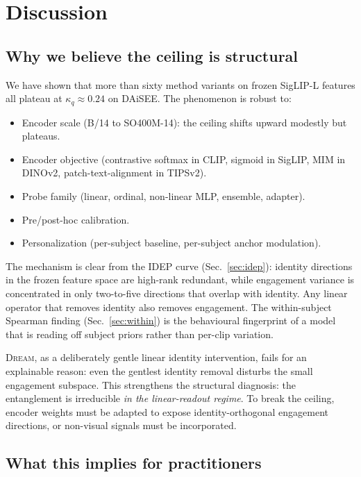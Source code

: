 \section{Discussion}
\label{sec:discussion}

\subsection{Why we believe the ceiling is structural}

We have shown that more than sixty method variants on frozen
SigLIP-L features all plateau at $\kappa_q \approx 0.24$ on
DAiSEE. The phenomenon is robust to:
\begin{itemize}\itemsep0pt
  \item Encoder scale (B/14 to SO400M-14): the ceiling shifts
  upward modestly but plateaus.
  \item Encoder objective (contrastive softmax in CLIP, sigmoid in
  SigLIP, MIM in DINOv2, patch-text-alignment in TIPSv2).
  \item Probe family (linear, ordinal, non-linear MLP, ensemble,
  adapter).
  \item Pre/post-hoc calibration.
  \item Personalization (per-subject baseline, per-subject anchor
  modulation).
\end{itemize}

The mechanism is clear from the IDEP curve (Sec.~\ref{sec:idep}):
identity directions in the frozen feature space are high-rank
redundant, while engagement variance is concentrated in only
two-to-five directions that overlap with identity. Any linear
operator that removes identity also removes engagement. The
within-subject Spearman finding (Sec.~\ref{sec:within}) is the
behavioural fingerprint of a model that is reading off subject
priors rather than per-clip variation.

\textsc{Dream}, as a deliberately gentle linear identity
intervention, fails for an explainable reason: even the gentlest
identity removal disturbs the small engagement subspace. This
strengthens the structural diagnosis: the entanglement is
irreducible \emph{in the linear-readout regime}. To break the
ceiling, encoder weights must be adapted to expose
identity-orthogonal engagement directions, or non-visual signals
must be incorporated.

\subsection{What this implies for practitioners}

